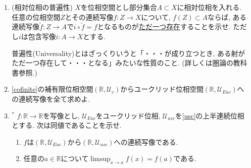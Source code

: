 \documentclass[dvipdfmx,a4paper,11pt]{article}
\newcommand{\R}{\mathbb{R}}
\theoremstyle{definition}
\begin{document}
\begin{enumerate}[ label=\textbf{問}\ref*{sec-conti}.\arabic*]

\item (相対位相の普遍性) $X$を位相空間とし部分集合$A\subset X$に相対位相を入れる. 
任意の位相空間$Z$とその連続写像$f : Z \to X$について, $f(Z) \subset A$ならば, ある連続写像$\widetilde{f} : Z \to A$で$i \circ \widetilde{f}= f$となるものが\underline{ただ一つ存在}することを示せ. ただし$i$は包含写像$i: A \to X$とする. 

   \begin{tcolorbox}[
    colback = white,
    colframe = green!35!black,
    fonttitle = \bfseries,
    breakable = true]
普遍性(Universality)とはざっくりいうと「・・・が成り立つとき, ある射がただ一つ存在して・・・となる」みたいな性質のこと. 
(詳しくは圏論の教科書参照.)
 \end{tcolorbox}
 

\item \ref{cofinite}の補有限位相空間$(\R, \mathscr{U}_c)$からユークリッド位相空間$(\R, \mathscr{U}_{Euc})$への連続写像を全て求めよ.


\item $^*$ $f : \R \rightarrow \R$を写像とし, $\mathscr{U}_{Euc}$をユークリッド位相, $\mathscr{U}_{usc}$を\ref{usc}の上半連続位相とする. 次は同値であることを示せ.
	\begin{enumerate}
	\setlength{\parskip}{0cm} 
  \setlength{\itemsep}{0cm} 
	\item $f$は$(\R, \mathscr{U}_{Euc})$から$(\R, \mathscr{U}_{usc})$への連続写像である.
	\item 任意の$a \in \R$について$\limsup_{x \rightarrow a} f(x) =f(a)$である.
	\end{enumerate}





\end{enumerate}
\end{document}

